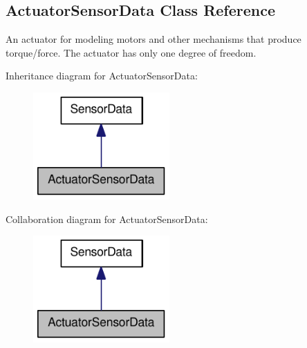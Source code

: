 \hypertarget{classOpenRAVE_1_1SensorBase_1_1ActuatorSensorData}{
\subsection{ActuatorSensorData Class Reference}
\label{classOpenRAVE_1_1SensorBase_1_1ActuatorSensorData}
}


An actuator for modeling motors and other mechanisms that produce torque/force. The actuator has only one degree of freedom.  




Inheritance diagram for ActuatorSensorData:\nopagebreak
\begin{figure}[H]
\begin{center}
\leavevmode
\includegraphics[width=148pt]{classOpenRAVE_1_1SensorBase_1_1ActuatorSensorData__inherit__graph}
\end{center}
\end{figure}


Collaboration diagram for ActuatorSensorData:\nopagebreak
\begin{figure}[H]
\begin{center}
\leavevmode
\includegraphics[width=148pt]{classOpenRAVE_1_1SensorBase_1_1ActuatorSensorData__coll__graph}
\end{center}
\end{figure}
